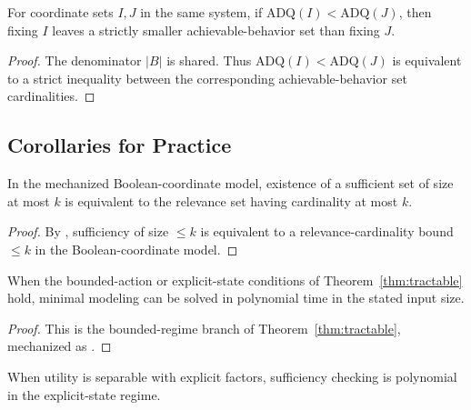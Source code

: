\begin{proposition}\label{prop:adq-ordering}
For coordinate sets $I,J$ in the same system, if $\mathrm{ADQ}(I) < \mathrm{ADQ}(J)$, then fixing $I$ leaves a strictly smaller achievable-behavior set than fixing $J$.
\end{proposition}

\begin{proof}
The denominator $|B|$ is shared. Thus $\mathrm{ADQ}(I) < \mathrm{ADQ}(J)$ is equivalent to a strict inequality between the corresponding achievable-behavior set cardinalities.
\end{proof}

\subsection{Corollaries for Practice}

\begin{corollary}\label{cor:practice-diagnostic}
In the mechanized Boolean-coordinate model, existence of a sufficient set of size at most $k$ is equivalent to the relevance set having cardinality at most $k$.
\end{corollary}

\begin{proof}
By , sufficiency of size $\le k$ is equivalent to a relevance-cardinality bound $\le k$ in the Boolean-coordinate model.
\end{proof}

\begin{corollary}\label{cor:practice-bounded}
When the bounded-action or explicit-state conditions of Theorem~\ref{thm:tractable} hold, minimal modeling can be solved in polynomial time in the stated input size.
\end{corollary}

\begin{proof}
This is the bounded-regime branch of Theorem~\ref{thm:tractable}, mechanized as .
\end{proof}

\begin{corollary}\label{cor:practice-structured}
When utility is separable with explicit factors, sufficiency checking is polynomial in the explicit-state regime.
\end{corollary}

